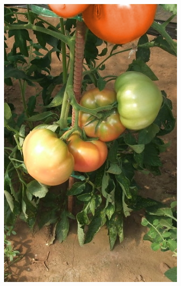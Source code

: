 \begin{figure}[t]
  \centering
  \begin{subfigure}[b]{0.2\linewidth}
    \includegraphics[width=\textwidth]{0}
  \end{subfigure}
  \hspace{\fill}
  ~
  \begin{subfigure}[b]{0.2\linewidth}

\end{subfigure}
\end{figure}
